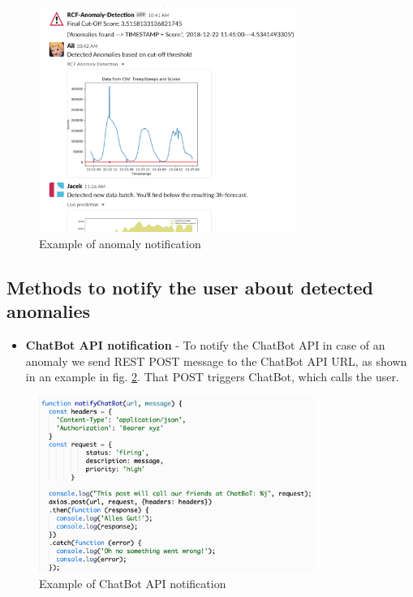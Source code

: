 \begin{figure}[h!]
    \centering
    \includegraphics[width=0.75\textwidth]{images/UserNotification.png}
    \caption{Example of anomaly notification}
    \label{fig:userNotif}
\end{figure}
\newpage
\subsection{Methods to notify the user about detected anomalies}
\begin{itemize}
\item \textbf{ChatBot API notification} - To notify the ChatBot API in case of an anomaly we send REST POST message to the ChatBot API URL, as shown in an example in fig. \ref{fig:chatbot}. That POST triggers ChatBot, which calls the user.
\end{itemize}

\begin{figure}[h!]
    \centering
    \includegraphics[width=0.8\textwidth]{images/chatbot-api-notif.png}
    \caption{Example of ChatBot API notification}
    \label{fig:chatbot}
\end{figure}


